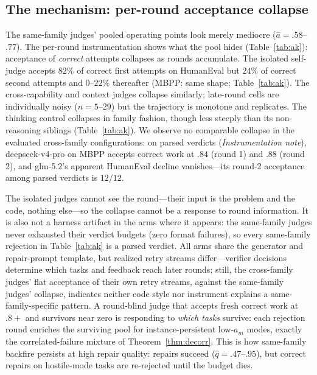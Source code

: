\documentclass[10pt]{article}
\begin{document}
\subsection{The mechanism: per-round acceptance collapse}
\label{sec:collapse}
The same-family judges' pooled operating points look merely
mediocre ($\hat a = .58$--$.77$).  The per-round instrumentation
shows what the pool hides (Table~\ref{tab:ak}): acceptance of
\emph{correct} attempts collapses as rounds accumulate.  The
isolated self-judge accepts $82\%$ of correct first attempts
on HumanEval but $24\%$ of correct second attempts and
$0$--$22\%$ thereafter (MBPP: same shape; Table~\ref{tab:ak}).
The cross-capability
and context judges collapse similarly; late-round cells are
individually noisy ($n = 5$--$29$) but the trajectory is monotone
and replicates.
The thinking control collapses in family fashion, though less
steeply than its non-reasoning siblings (Table~\ref{tab:ak}).
We observe no
comparable collapse in the evaluated cross-family configurations:
on parsed verdicts (\emph{Instrumentation
note}), deepseek-v4-pro on MBPP accepts correct work at $.84$
(round 1) and $.88$ (round 2), and glm-5.2's apparent HumanEval
decline vanishes---its round-2 acceptance among parsed verdicts
is $12/12$.

The isolated judges cannot see the round---their input is the
problem and the code, nothing else---so the collapse cannot be a
response to round information.  It is also not a harness artifact
in the arms where it appears: the same-family judges never
exhausted their verdict budgets (zero format failures), so every
same-family rejection in Table~\ref{tab:ak} is a parsed verdict.
All arms share the generator and repair-prompt template, but
realized retry streams differ---verifier decisions determine
which tasks and feedback reach later rounds; still, the
cross-family judges' flat acceptance of their own retry streams,
against the same-family judges' collapse, indicates neither code
style nor instrument explains a same-family-specific pattern.
A round-blind
judge that accepts fresh correct work at $.8+$ and survivors near
zero is responding to \emph{which tasks} survive: each rejection
round enriches the surviving pool for instance-persistent
low-$a_m$ modes, exactly the correlated-failure mixture of
Theorem~\ref{thm:decorr}.  This
is how same-family backfire persists at high repair quality:
repairs succeed ($\hat q = .47$--$.95$), but correct repairs on
hostile-mode tasks are re-rejected until the budget dies.
\end{document}

